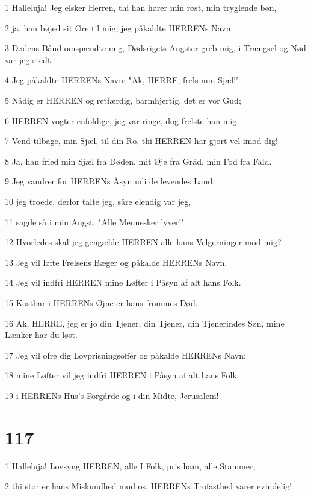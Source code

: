 \par 1 Halleluja! Jeg elsker Herren, thi han hører min røst, min tryglende bøn,
\par 2 ja, han bøjed sit Øre til mig, jeg påkaldte HERRENs Navn.
\par 3 Dødens Bånd omspændte mig, Dødsrigets Angster greb mig, i Trængsel og Nød var jeg stedt.
\par 4 Jeg påkaldte HERRENs Navn: "Ak, HERRE, frels min Sjæl!"
\par 5 Nådig er HERREN og retfærdig, barmhjertig, det er vor Gud;
\par 6 HERREN vogter enfoldige, jeg var ringe, dog frelste han mig.
\par 7 Vend tilbage, min Sjæl, til din Ro, thi HERREN har gjort vel imod dig!
\par 8 Ja, han fried min Sjæl fra Døden, mit Øje fra Gråd, min Fod fra Fald.
\par 9 Jeg vandrer for HERRENs Åsyn udi de levendes Land;
\par 10 jeg troede, derfor talte jeg, såre elendig var jeg,
\par 11 sagde så i min Angst: "Alle Mennesker lyver!"
\par 12 Hvorledes skal jeg gengælde HERREN alle hans Velgerninger mod mig?
\par 13 Jeg vil løfte Frelsens Bæger og påkalde HERRENs Navn.
\par 14 Jeg vil indfri HERREN mine Løfter i Påsyn af alt hans Folk.
\par 15 Kostbar i HERRENs Øjne er hans frommes Død.
\par 16 Ak, HERRE, jeg er jo din Tjener, din Tjener, din Tjenerindes Søn, mine Lænker har du løst.
\par 17 Jeg vil ofre dig Lovprisningsoffer og påkalde HERRENs Navn;
\par 18 mine Løfter vil jeg indfri HERREN i Påsyn af alt hans Folk
\par 19 i HERRENs Hus's Forgårde og i din Midte, Jerusalem!

\chapter{117}

\par 1 Halleluja! Lovsyng HERREN, alle I Folk, pris ham, alle Stammer,
\par 2 thi stor er hans Miskundhed mod os, HERRENs Trofasthed varer evindelig!

